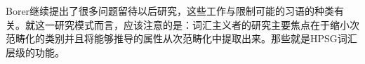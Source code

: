 \begin{exe}
\begin{xlist}[iv.]
\begin{exe}
\begin{xlist}[iv.]
\begin{quote}
{%
}
\end{quote}
Borer继续提出了很多问题留待以后研究，这些工作与限制可能的习语的种类有关。就这一研究模式而言，应该注意的是：词汇主义者的研究主要焦点在于缩小次范畴化的类别并且将能够推导的属性从次范畴化中提取出来。那些就是HPSG词汇层级的功能。
%


\end{xlist}
\end{exe}
\end{xlist}
\end{exe}
